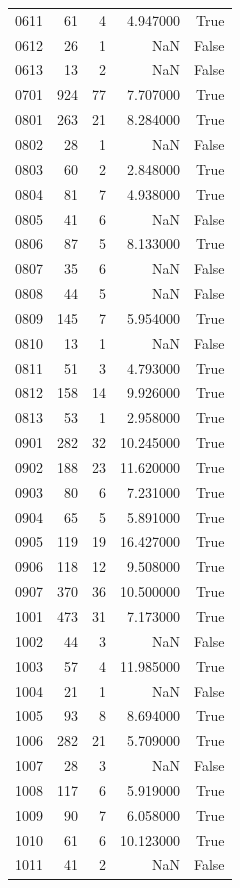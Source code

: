 \begin{longtable}{lrrrr}
0611 & 61 & 4 & 4.947000 & True \\
0612 & 26 & 1 & NaN & False \\
0613 & 13 & 2 & NaN & False \\
0701 & 924 & 77 & 7.707000 & True \\
0801 & 263 & 21 & 8.284000 & True \\
0802 & 28 & 1 & NaN & False \\
0803 & 60 & 2 & 2.848000 & True \\
0804 & 81 & 7 & 4.938000 & True \\
0805 & 41 & 6 & NaN & False \\
0806 & 87 & 5 & 8.133000 & True \\
0807 & 35 & 6 & NaN & False \\
0808 & 44 & 5 & NaN & False \\
0809 & 145 & 7 & 5.954000 & True \\
0810 & 13 & 1 & NaN & False \\
0811 & 51 & 3 & 4.793000 & True \\
0812 & 158 & 14 & 9.926000 & True \\
0813 & 53 & 1 & 2.958000 & True \\
0901 & 282 & 32 & 10.245000 & True \\
0902 & 188 & 23 & 11.620000 & True \\
0903 & 80 & 6 & 7.231000 & True \\
0904 & 65 & 5 & 5.891000 & True \\
0905 & 119 & 19 & 16.427000 & True \\
0906 & 118 & 12 & 9.508000 & True \\
0907 & 370 & 36 & 10.500000 & True \\
1001 & 473 & 31 & 7.173000 & True \\
1002 & 44 & 3 & NaN & False \\
1003 & 57 & 4 & 11.985000 & True \\
1004 & 21 & 1 & NaN & False \\
1005 & 93 & 8 & 8.694000 & True \\
1006 & 282 & 21 & 5.709000 & True \\
1007 & 28 & 3 & NaN & False \\
1008 & 117 & 6 & 5.919000 & True \\
1009 & 90 & 7 & 6.058000 & True \\
1010 & 61 & 6 & 10.123000 & True \\
1011 & 41 & 2 & NaN & False \\

\end{longtable}
